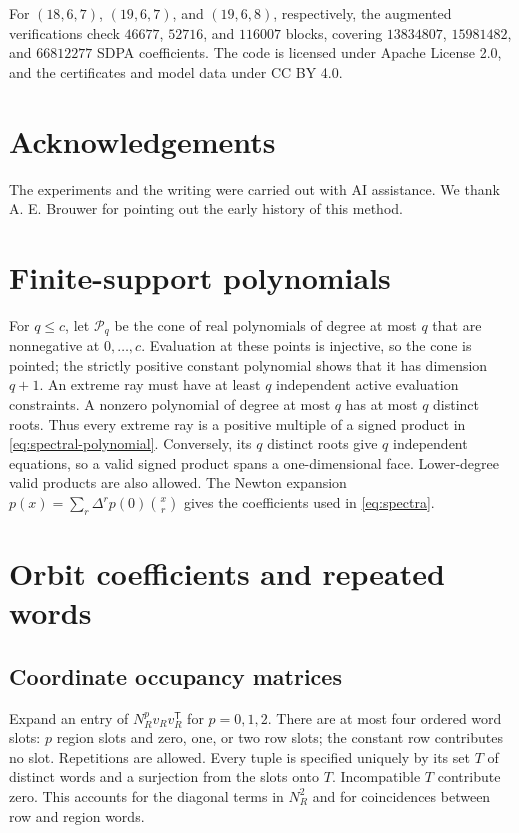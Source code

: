\documentclass[11pt]{article}
\begin{document}
For $(18,6,7)$, $(19,6,7)$, and $(19,6,8)$, respectively, the augmented
verifications check $46677$, $52716$, and $116007$ blocks, covering
$13834807$, $15981482$, and $66812277$ SDPA coefficients. The code is
licensed under Apache License 2.0, and the certificates and model data under
CC BY 4.0.

\section*{Acknowledgements}

The experiments and the writing were carried out with AI assistance.
We thank A. E. Brouwer for pointing out the early history of this method.

\appendix

\section{Finite-support polynomials}\label{app:spectra}

For $q\le c$, let $\mathcal P_q$ be the cone of real polynomials of degree
at most $q$ that are nonnegative at $0,\ldots,c$. Evaluation at these points
is injective, so the cone is pointed; the strictly positive constant
polynomial shows that it has dimension $q+1$. An extreme ray must have at
least $q$ independent active evaluation constraints. A nonzero polynomial
of degree at most $q$ has at most $q$ distinct roots. Thus every extreme ray
is a positive multiple of a signed product in
\eqref{eq:spectral-polynomial}. Conversely, its $q$ distinct roots give
$q$ independent equations, so a valid signed product spans a one-dimensional
face. Lower-degree valid products are also allowed. The Newton expansion
$p(x)=\sum_r\Delta^rp(0)\binom xr$ gives the coefficients used in
\eqref{eq:spectra}.

\section{Orbit coefficients and repeated words}\label{app:coefficients}

\subsection{Coordinate occupancy matrices}

Expand an entry of $N_R^p v_Rv_R^{\mathsf T}$ for $p=0,1,2$. There are at
most four ordered word slots: $p$ region slots and zero, one, or two row
slots; the constant row contributes no slot. Repetitions are allowed.
Every tuple is specified uniquely by its set $T$ of distinct words and a
surjection from the slots onto $T$. Incompatible $T$ contribute zero.
This accounts for the diagonal terms in $N_R^2$ and for coincidences between
row and region words.
\end{document}
